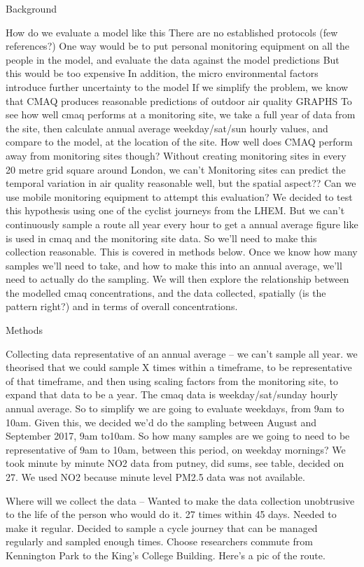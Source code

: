 Background

How do we evaluate a model like this
There are no established protocols (few references?)
One way would be to put personal monitoring equipment on all the people in the model, and evaluate the data against the model predictions
But this would be too expensive
In addition, the micro environmental factors introduce further uncertainty to the model
If we simplify the problem, we know that CMAQ produces reasonable predictions of outdoor air quality
GRAPHS
To see how well cmaq performs at a monitoring site, we take a full year of data from the site, then calculate annual average weekday/sat/sun hourly values, and compare to the model, at the location of the site.
How well does CMAQ perform away from monitoring sites though? 
Without creating monitoring sites in every 20 metre grid square around London, we can't
Monitoring sites can predict the temporal variation in air quality reasonable well, but the spatial aspect??
Can we use mobile monitoring equipment to attempt this evaluation? 
We decided to test this hypothesis using one of the cyclist journeys from the LHEM. But we can't continuously sample a route all year every hour to get a annual average figure like is used in cmaq and the monitoring site data. So we'll need to make this collection reasonable. This is covered in methods below.
Once we know how many samples we'll need to take, and how to make this into an annual average, we'll need to actually do the sampling. We will then explore the relationship between the modelled cmaq concentrations, and the data collected, spatially (is the pattern right?) and in terms of overall concentrations.

Methods

Collecting data representative of an annual average -- we can't sample all year. we theorised that we could sample X times within a timeframe, to be representative of that timeframe, and then using scaling factors from the monitoring site, to expand that data to be a year. The cmaq data is weekday/sat/sunday hourly annual average. So to simplify we are going to evaluate weekdays, from 9am to 10am. Given this, we decided we'd do the sampling between August and September 2017, 9am to10am. So how many samples are we going to need to be representative of 9am to 10am, between this period, on weekday mornings? We took minute by minute NO2 data from putney, did sums, see table, decided on 27. We used NO2 because minute level PM2.5 data was not available.

Where will we collect the data -- Wanted to make the data collection unobtrusive to the life of the person who would do it. 27 times within 45 days. Needed to make it regular. Decided to sample a cycle journey that can be managed regularly and sampled enough times. Choose researchers commute from Kennington Park to the King's College Building. Here's a pic of the route.

